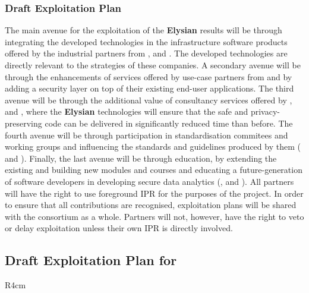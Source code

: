 \documentclass[a4paper,11pt]{article}
\newcommand{\project}[1]{\textbf{#1}\xspace}
\newcommand{\SECURITY}{\project{Elysian}}
\newcommand{\TheProject}{\SECURITY}
\begin{document}

\subsubsection{Draft Exploitation Plan}
\label{sect:exploitation-plan}
\vspace{-12pt}
The main avenue for the exploitation of the \TheProject{} results will be through integrating the developed technologies in the infrastructure software products offered by the industrial partners from \IBMshort{}, \YAGshort{} and \COGNIshort{}. The developed technologies are directly relevant to the strategies of these companies. A secondary avenue will be through the enhancements of services offered by use-case partners from \SOPRAshort{} and \FRQshort{} by adding a security layer on top of their existing end-user applications. The third avenue will be through the additional value of consultancy services offered by \SOPRAshort{}, \SCCHshort{} and \UODshort{}, where the \TheProject{} technologies will ensure that the safe and privacy-preserving code can be delivered in significantly reduced time than before. The fourth avenue will be through participation in standardisation commitees and working groups and influencing the standards and guidelines produced by them (\UCMshort{} and \FRQshort{}). Finally, the last avenue will be through education, by extending the existing and building new modules and courses and educating a future-generation of software developers in developing secure data analytics (\SAshort{}, \UODshort{} and \UCMshort{}). All partners will have the right to use foreground IPR for the purposes of the project. In order to ensure that all contributions are recognised, exploitation plans will be shared with the consortium as a whole. Partners will not, however, have the right to veto or delay exploitation unless their own IPR is directly involved.


\horizontalline

\subsection*{Draft Exploitation Plan for \IBMshort{}}

\begin{wrapfigure}{R}{4cm}
\vspace{-1.4cm}
\hfill {}
\vspace{-0.6cm}
\end{wrapfigure}
\end{document}
